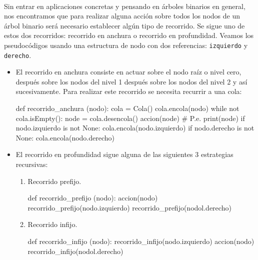 \

Sin entrar en aplicaciones concretas y pensando en árboles binarios en general, nos encontramos que para realizar alguna acción sobre todos los nodos de un árbol binario será necesario establecer algún tipo de recorrido. Se sigue uno de estos dos recorridos: recorrido en anchura o recorrido en profundidad. Veamos los pseudocódigos usando una estructura de nodo con dos referencias: \texttt{izquierdo} y \texttt{derecho}.

\begin{itemize}
\item El recorrido en anchura consiste en actuar sobre el nodo raíz o nivel cero, después sobre los nodos del nivel 1 después sobre los nodos del nivel 2 y así sucesivamente. Para realizar este recorrido se necesita recurrir a una cola:

\hfil\begin{minipage}{.5\textwidth}
\begin{pyverbatim}[][frame=single]
def recorrido_anchura (nodo):
    cola = Cola()
    cola.encola(nodo)
    while not cola.isEmpty():
        node = cola.desencola()
        accion(node) # P.e. print(node)
        if  nodo.izquierdo is not None:
            cola.encola(nodo.izquierdo)
        if nodo.derecho is not None:
            cola.encola(nodo.derecho)
\end{pyverbatim}
\end{minipage}


\item El recorrido en profundidad sigue alguna de las siguientes  3 estrategias recursivas:

\begin{enumerate}
\item Recorrido prefijo.


\hfil\begin{minipage}{.42\textwidth}
\begin{pyverbatim}[][frame=single]
def recorrido_prefijo (nodo):
    accion(nodo)
    recorrido_prefijo(nodo.izquierdo)
    recorrido_prefijo(nodol.derecho)
\end{pyverbatim}
\end{minipage}

\item Recorrido infijo.

\hfil\begin{minipage}{.42\textwidth}
\begin{pyverbatim}[][frame=single]
def recorrido_infijo (nodo):
    recorrido_infijo(nodo.izquierdo)
    accion(nodo)
    recorrido_infijo(nodol.derecho)
\end{pyverbatim}
\end{minipage}


\end{enumerate}
\end{itemize}
